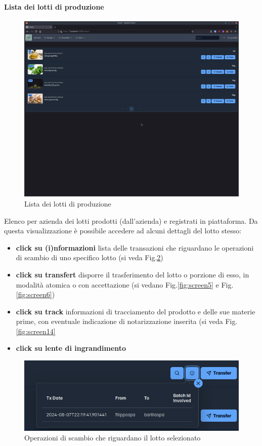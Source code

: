 \documentclass[a4paper,11pt]{article}
\begin{document}
\paragraph{Lista dei lotti di produzione}

\begin{figure}[H]
  \centering
  \includegraphics[width=0.5\linewidth]{screenIotChain/0003.png}
  \caption{Lista dei lotti di produzione}
  \label{fig:screen3}
\end{figure}

Elenco per azienda dei lotti prodotti (dall'azienda) e registrati in piattaforma. Da questa visualizzazione è possibile accedere ad alcuni dettagli del lotto stesso:

\begin{itemize}
  \item \textbf{click su (i)nformazioni} lista delle transazioni che riguardano le operazioni di scambio di uno specifico lotto (si veda Fig.\ref{fig:screen4})
  \item \textbf{click su transfert} disporre il trasferimento del lotto o porzione di esso, in modalità atomica o con accettazione (si vedano Fig.\ref{fig:screen5} e Fig.\ref{fig:screen6})
  \item  \textbf{click su track} informazioni di tracciamento del prodotto e delle sue materie prime, con eventuale indicazione di notarizzazione inserita (si veda Fig. \ref{fig:screen14}
  \item  \textbf{click su lente di ingrandimento} %
\end{itemize}

\begin{figure}[H]
  \centering
  \includegraphics[width=0.5\linewidth]{screenIotChain/0004.png}
  \caption{Operazioni di scambio che riguardano il lotto selezionato}
  \label{fig:screen4}
\end{figure}
\end{document}

